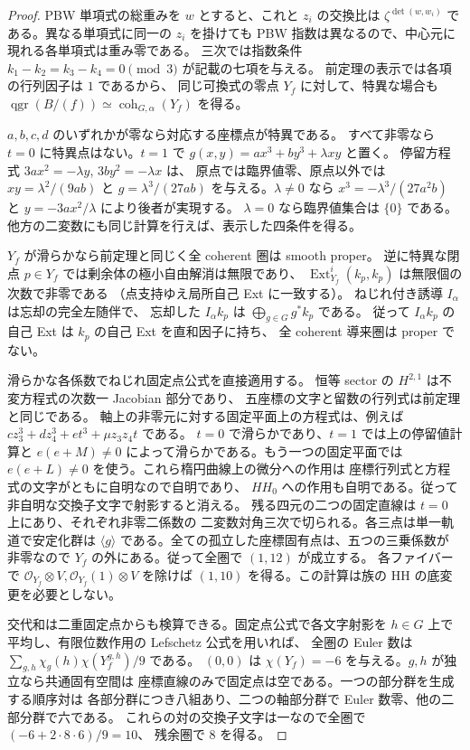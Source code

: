 \begin{proof}
PBW 単項式の総重みを $w$ とすると、これと $z_i$ の交換比は
$\zeta^{\det(w,w_i)}$ である。異なる単項式に同一の $z_i$ を掛けても
PBW 指数は異なるので、中心元に現れる各単項式は重み零である。
三次では指数条件 $k_1-k_2=k_3-k_4=0\pmod 3$ が記載の七項を与える。
前定理の表示では各項の行列因子は $1$ であるから、
同じ可換式の零点 $Y_f$ に対して、特異な場合も
$\operatorname{qgr}(B/(f))\simeq\operatorname{coh}_{G,\alpha}(Y_f)$ を得る。

$a,b,c,d$ のいずれかが零なら対応する座標点が特異である。
すべて非零なら $t=0$ に特異点はない。$t=1$ で
$g(x,y)=a x^3+b y^3+\lambda xy$ と置く。
停留方程式 $3ax^2=-\lambda y$, $3by^2=-\lambda x$ は、
原点では臨界値零、原点以外では $xy=\lambda^2/(9ab)$ と
$g=\lambda^3/(27ab)$ を与える。$\lambda\ne0$ なら
$x^3=-\lambda^3/(27a^2b)$ と $y=-3ax^2/\lambda$ により後者が実現する。
$\lambda=0$ なら臨界値集合は $\{0\}$ である。
他方の二変数にも同じ計算を行えば、表示した四条件を得る。

$Y_f$ が滑らかなら前定理と同じく全 coherent 圏は smooth proper。
逆に特異な閉点 $p\in Y_f$ では剰余体の極小自由解消は無限であり、
$\operatorname{Ext}^i_{Y_f}(k_p,k_p)$ は無限個の次数で非零である
（点支持ゆえ局所自己 Ext に一致する）。
ねじれ付き誘導 $I_\alpha$ は忘却の完全左随伴で、
忘却した $I_\alpha k_p$ は $\bigoplus_{g\in G}g^*k_p$ である。
従って $I_\alpha k_p$ の自己 Ext は $k_p$ の自己 Ext を直和因子に持ち、
全 coherent 導来圏は proper でない。

滑らかな各係数でねじれ固定点公式を直接適用する。
恒等 sector の $H^{2,1}$ は不変方程式の次数一 Jacobian 部分であり、
五座標の文字と留数の行列式は前定理と同じである。
軸上の非零元に対する固定平面上の方程式は、例えば
$c z_3^3+d z_4^3+e t^3+\mu z_3z_4t$ である。
$t=0$ で滑らかであり、$t=1$ では上の停留値計算と
$e(e+M)\ne0$ によって滑らかである。もう一つの固定平面では
$e(e+L)\ne0$ を使う。これら楕円曲線上の微分への作用は
座標行列式と方程式の文字がともに自明なので自明であり、
$HH_0$ への作用も自明である。従って非自明な交換子文字で射影すると消える。
残る四元の二つの固定直線は $t=0$ 上にあり、それぞれ非零二係数の
二変数対角三次で切られる。各三点は単一軌道で安定化群は
$\langle g\rangle$ である。全ての孤立した座標固有点は、五つの三乗係数が
非零なので $Y_f$ の外にある。従って全圏で $(1,12)$ が成立する。
各ファイバーで $\mathcal O_{Y_f}\otimes V,\mathcal O_{Y_f}(1)\otimes V$
を除けば $(1,10)$ を得る。この計算は族の HH の底変更を必要としない。

交代和は二重固定点からも検算できる。固定点公式で各文字射影を
$h\in G$ 上で平均し、有限位数作用の Lefschetz 公式を用いれば、
全圏の Euler 数は $\sum_{g,h}\chi_g(h)\chi(Y_f^{g,h})/9$ である。
$(0,0)$ は $\chi(Y_f)=-6$ を与える。$g,h$ が独立なら共通固有空間は
座標直線のみで固定点は空である。一つの部分群を生成する順序対は
各部分群につき八組あり、二つの軸部分群で Euler 数零、他の二部分群で六である。
これらの対の交換子文字は一なので全圏で $(-6+2\cdot8\cdot6)/9=10$、
残余圏で $8$ を得る。


\end{proof}

